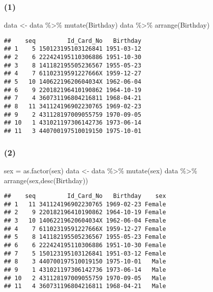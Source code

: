 \documentclass[
]{article}
\newenvironment{Shaded}{\begin{snugshade}}{\end{snugshade}}
\newcommand{\FunctionTok}[1]{\textcolor[rgb]{0.00,0.00,0.00}{#1}}
\newcommand{\NormalTok}[1]{#1}
\newcommand{\OtherTok}[1]{\textcolor[rgb]{0.56,0.35,0.01}{#1}}
\newcommand{\SpecialCharTok}[1]{\textcolor[rgb]{0.00,0.00,0.00}{#1}}
\begin{document}
\hypertarget{section-4}{%
\subsubsection{(1)}\label{section-4}}

\begin{Shaded}
\begin{Highlighting}[]
\NormalTok{data }\OtherTok{\textless{}{-}}\NormalTok{ data }\SpecialCharTok{\%\textgreater{}\%} \FunctionTok{mutate}\NormalTok{(Birthday)}
\NormalTok{data }\SpecialCharTok{\%\textgreater{}\%} \FunctionTok{arrange}\NormalTok{(Birthday) }
\end{Highlighting}
\end{Shaded}

\begin{verbatim}
##    seq         Id_Card_No   Birthday
## 1    5 150123195103126841 1951-03-12
## 2    6 222424195110306886 1951-10-30
## 3    8 141182195505236567 1955-05-23
## 4    7 61102319591227666X 1959-12-27
## 5   10 14062219620604034X 1962-06-04
## 6    9 220182196410190862 1964-10-19
## 7    4 360731196804216811 1968-04-21
## 8   11 341124196902230765 1969-02-23
## 9    2 431128197009055759 1970-09-05
## 10   1 431021197306142736 1973-06-14
## 11   3 440700197510019150 1975-10-01
\end{verbatim}

\hypertarget{section-5}{%
\subsubsection{(2)}\label{section-5}}

\begin{Shaded}
\begin{Highlighting}[]
\NormalTok{sex }\OtherTok{=} \FunctionTok{as.factor}\NormalTok{(sex)}
\NormalTok{data }\OtherTok{\textless{}{-}}\NormalTok{ data }\SpecialCharTok{\%\textgreater{}\%} \FunctionTok{mutate}\NormalTok{(sex)}
\NormalTok{data }\SpecialCharTok{\%\textgreater{}\%} \FunctionTok{arrange}\NormalTok{(sex,}\FunctionTok{desc}\NormalTok{(Birthday)) }
\end{Highlighting}
\end{Shaded}

\begin{verbatim}
##    seq         Id_Card_No   Birthday    sex
## 1   11 341124196902230765 1969-02-23 Female
## 2    9 220182196410190862 1964-10-19 Female
## 3   10 14062219620604034X 1962-06-04 Female
## 4    7 61102319591227666X 1959-12-27 Female
## 5    8 141182195505236567 1955-05-23 Female
## 6    6 222424195110306886 1951-10-30 Female
## 7    5 150123195103126841 1951-03-12 Female
## 8    3 440700197510019150 1975-10-01   Male
## 9    1 431021197306142736 1973-06-14   Male
## 10   2 431128197009055759 1970-09-05   Male
## 11   4 360731196804216811 1968-04-21   Male
\end{verbatim}
\end{document}

